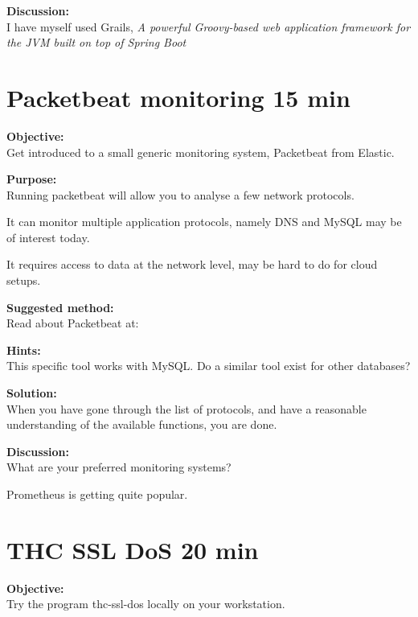 \documentclass[a4paper,11pt,notitlepage]{report}
\begin{document}
{\bf Discussion:}\\
I have myself used Grails,
\emph{A powerful Groovy-based web application framework for the JVM built on top of Spring Boot}





\chapter{Packetbeat monitoring 15 min}
\label{ex:packetbeat}


{\bf Objective:}\\
Get introduced to a small generic monitoring system, Packetbeat from Elastic.


{\bf Purpose:}\\
Running packetbeat will allow you to analyse a few network protocols.

It can monitor multiple application protocols, namely DNS and MySQL may be of interest today.

It requires access to data at the network level, may be hard to do for cloud setups.

{\bf Suggested method:}\\
Read about Packetbeat at:\\

{\bf Hints:}\\
This specific tool works with MySQL. Do a similar tool exist for other databases?


{\bf Solution:}\\
When you have gone through the list of protocols, and have a reasonable understanding of the available functions, you are done.

{\bf Discussion:}\\
What are your preferred monitoring systems?

Prometheus is getting quite popular.



\chapter{THC SSL DoS 20 min}
\label{ex:thc-ssl-dos}

{\bf Objective:}\\
Try the program thc-ssl-dos locally on your workstation.
\end{document}
